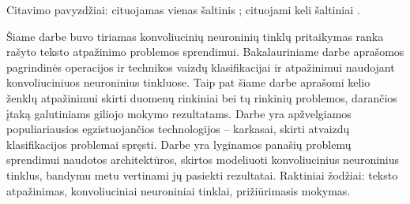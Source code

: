 \documentclass{VUMIFInfBakalaurinis}
\begin{document}
\printbibliography[heading=bibintoc] %
Citavimo pavyzdžiai: cituojamas vienas šaltinis \cite{PvzStraipsnLt}; cituojami
keli šaltiniai \cite{PvzStraipsnEn, PvzKonfLt, PvzKonfEn, PvzKnygLt, PvzKnygEn, PvzElPubLt, PvzElPubEn, PvzMagistrLt, PvzPhdEn}.

Šiame darbe buvo tiriamas konvoliucinių neuroninių tinklų pritaikymas ranka rašyto teksto atpažinimo problemos sprendimui. Bakalauriniame darbe aprašomos pagrindinės operacijos ir technikos vaizdų klasifikacijai ir atpažinimui naudojant konvoliuciniuos neuroninius tinkluose. Taip pat šiame darbe aprašomi kelio ženklų atpažinimui skirti duomenų rinkiniai bei tų rinkinių problemos, darančios įtaką galutiniams giliojo mokymo rezultatams. Darbe yra apžvelgiamos populiariausios egzistuojančios technologijos – karkasai, skirti atvaizdų klasifikacijos problemai spręsti. Darbe yra lyginamos panašių problemų sprendimui naudotos architektūros, skirtos modeliuoti konvoliucinius neuroninius tinklus, bandymu metu vertinami jų pasiekti rezultatai. 
Raktiniai žodžiai: teksto atpažinimas, konvoliuciniai neuroniniai tinklai, prižiūrimasis mokymas.

\end{document}
